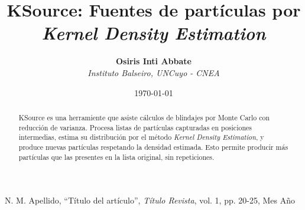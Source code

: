 \documentclass{article}
\title{\textbf{KSource: Fuentes de partículas por \emph{Kernel Density Estimation}} \vspace{4mm} }
\author{
    \textbf{Osiris Inti Abbate} \vspace{2mm} \\
    \textit{Instituto Balseiro, UNCuyo - CNEA}
}
\date{\today}
\begin{document}
\maketitle

\begin{abstract}

KSource es una herramiente que asiste cálculos de blindajes por Monte Carlo con reducción de varianza. Procesa listas de partículas capturadas en posiciones intermedias, estima su distribución por el método \emph{Kernel Density Estimation}, y produce nuevas partículas respetando la densidad estimada. Esto permite producir más partículas que las presentes en la lista original, sin repeticiones.

\end{abstract}





\appendix



\begin{thebibliography}{9}

	 N. M. Apellido, ``Título del artículo'', \textit{Título Revista}, vol. 1, pp. 20-25, Mes Año

\end{thebibliography}
\end{document}
